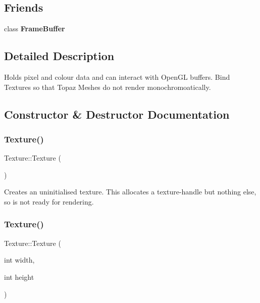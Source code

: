 \subsection*{Friends}
\begin{DoxyCompactItemize}
\item 
\mbox{\label{class_texture_a7e815028687ed9f9e9e25851d8a17b27}} 
class {\bfseries Frame\+Buffer}
\end{DoxyCompactItemize}


\subsection{Detailed Description}
Holds pixel and colour data and can interact with Open\+GL buffers. Bind Textures so that Topaz Meshes do not render monochromoatically. 

\subsection{Constructor \& Destructor Documentation}
\mbox{\label{class_texture_a6c275e3f186675ff6ed73ccf970e552f}} 
\subsubsection{\texorpdfstring{Texture()}{Texture()}\hspace{0.1cm}{\footnotesize\ttfamily [1/5]}}
{\footnotesize\ttfamily Texture\+::\+Texture (\begin{DoxyParamCaption}{ }\end{DoxyParamCaption})}

Creates an uninitialised texture. This allocates a texture-\/handle but nothing else, so is not ready for rendering. \mbox{\label{class_texture_a197b839d8525505209f4288071cc7185}} 
\subsubsection{\texorpdfstring{Texture()}{Texture()}\hspace{0.1cm}{\footnotesize\ttfamily [2/5]}}
{\footnotesize\ttfamily Texture\+::\+Texture (\begin{DoxyParamCaption}\item[{int}]{width,  }\item[{int}]{height }\end{DoxyParamCaption})}

